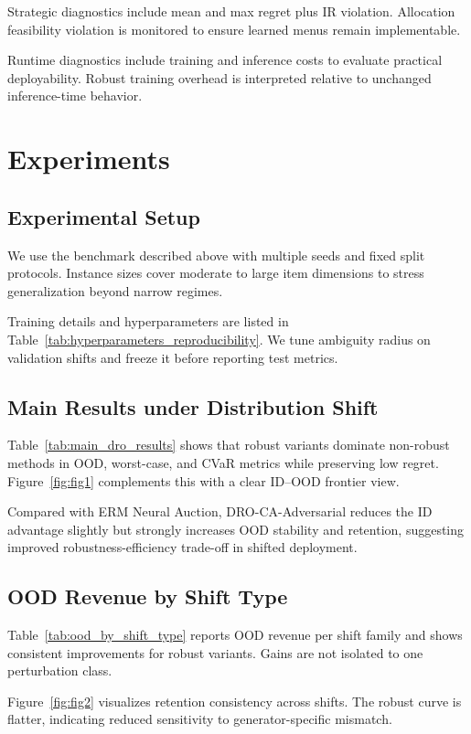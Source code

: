 \documentclass{article}
\begin{document}
Strategic diagnostics include mean and max regret plus IR violation. Allocation feasibility violation is monitored to ensure learned menus remain implementable.

Runtime diagnostics include training and inference costs to evaluate practical deployability. Robust training overhead is interpreted relative to unchanged inference-time behavior.

\section{Experiments}
\subsection{Experimental Setup}
We use the benchmark described above with multiple seeds and fixed split protocols. Instance sizes cover moderate to large item dimensions to stress generalization beyond narrow regimes.

Training details and hyperparameters are listed in Table~\ref{tab:hyperparameters_reproducibility}. We tune ambiguity radius on validation shifts and freeze it before reporting test metrics.

\subsection{Main Results under Distribution Shift}
Table~\ref{tab:main_dro_results} shows that robust variants dominate non-robust methods in OOD, worst-case, and CVaR metrics while preserving low regret. Figure~\ref{fig:fig1} complements this with a clear ID--OOD frontier view.

Compared with ERM Neural Auction, DRO-CA-Adversarial reduces the ID advantage slightly but strongly increases OOD stability and retention, suggesting improved robustness-efficiency trade-off in shifted deployment.

\subsection{OOD Revenue by Shift Type}
Table~\ref{tab:ood_by_shift_type} reports OOD revenue per shift family and shows consistent improvements for robust variants. Gains are not isolated to one perturbation class.

Figure~\ref{fig:fig2} visualizes retention consistency across shifts. The robust curve is flatter, indicating reduced sensitivity to generator-specific mismatch.
\end{document}
